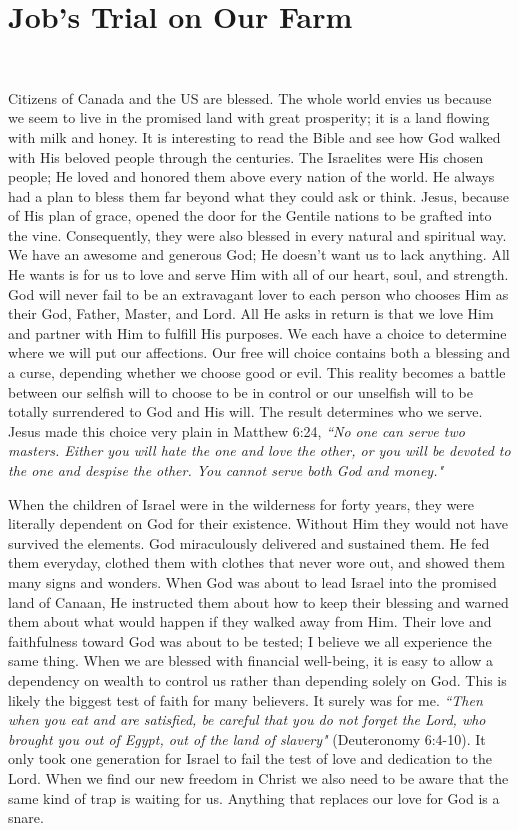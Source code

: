 \documentclass[oneside]{book}
\begin{document}
\chapter{Job's Trial on Our Farm}
\

Citizens of Canada and the US are blessed. The whole world envies us because we seem to live in the promised land with great prosperity; it is a land flowing with milk and honey. It is  interesting to read the Bible and see how God walked with His beloved people through the centuries. The Israelites were His chosen people; He loved and honored them above every nation of the world. He always had a plan to bless them far beyond what they could ask or think. Jesus, because of His plan of grace, opened the door for the Gentile nations to be grafted into the vine. Consequently, they were also blessed in every natural and spiritual way. We have an awesome and generous God; He doesn't want us to lack anything. All He wants is for us to love and serve Him with all of our heart, soul, and strength. God will never fail to be an extravagant lover to each person who chooses Him as their God, Father, Master, and Lord. All He asks in return is that we love Him and partner with Him to fulfill His purposes. We each have a choice to determine where we will put our affections. Our free will choice contains both a blessing and a curse, depending whether we choose good or evil. This reality becomes a battle between our selfish will to choose to be in control or our unselfish will to be totally surrendered to God and His will. The result determines who we serve. Jesus made this choice very plain in Matthew 6:24, \textit{``No one can serve two masters. Either you will hate the one and love the other, or you will be devoted to the one and despise the other. You cannot serve both God and money."}

When the children of Israel were in the wilderness for forty years, they were literally dependent on God for their existence. Without Him they would not have survived the elements. God miraculously delivered and sustained them. He fed them everyday, clothed them with clothes that never wore out, and showed them many signs and wonders. When God was about to lead Israel into the promised land of Canaan, He instructed them about how to keep their blessing and warned them about what would happen if they walked away from Him. Their love and faithfulness toward God was about to be tested; I believe we all experience the same thing. When we are blessed with financial well-being, it is easy to allow a dependency on wealth to control us rather than depending solely on God. This is likely the biggest test of faith for many believers. It surely was for me. \textit{``Then when you eat and are satisfied, be careful that you do not forget the Lord, who brought you out of Egypt, out of the land of slavery"} (Deuteronomy 6:4-10). It only took one generation for Israel to fail the test of love and dedication to the Lord. When we find our new freedom in Christ we also need to be aware that the same kind of trap is waiting for us. Anything that replaces our love for God is a snare. 
\end{document}
